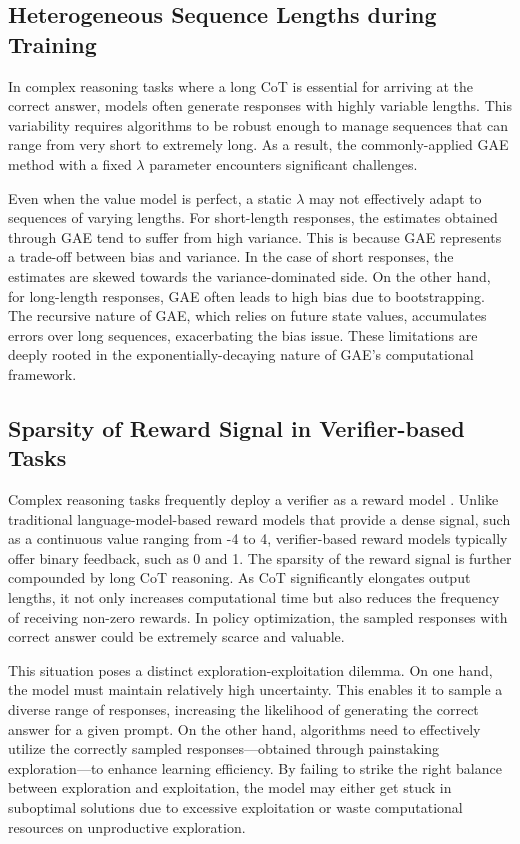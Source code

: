 \subsection{Heterogeneous Sequence Lengths during Training}

In complex reasoning tasks where a long CoT is essential for arriving at the correct answer, models often generate responses with highly variable lengths. This variability requires algorithms to be robust enough to manage sequences that can range from very short to extremely long. As a result, the commonly-applied GAE method with a fixed $\lambda$ parameter encounters significant challenges.

Even when the value model is perfect, a static $\lambda$ may not effectively adapt to sequences of varying lengths. For short-length responses, the estimates obtained through GAE tend to suffer from high variance. This is because GAE represents a trade-off between bias and variance. In the case of short responses, the estimates are skewed towards the variance-dominated side. On the other hand, for long-length responses, GAE often leads to high bias due to bootstrapping. The recursive nature of GAE, which relies on future state values, accumulates errors over long sequences, exacerbating the bias issue. These limitations are deeply rooted in the exponentially-decaying nature of GAE's computational framework.

\subsection{Sparsity of Reward Signal in Verifier-based Tasks}
\label{challenge3}

Complex reasoning tasks frequently deploy a verifier as a reward model \citep{o1, deepseekai2025deepseekr1incentivizingreasoningcapability}. Unlike traditional language-model-based reward models that provide a dense signal, such as a continuous value ranging from -4 to 4, verifier-based reward models typically offer binary feedback, such as 0 and 1. The sparsity of the reward signal is further compounded by long CoT reasoning. As CoT significantly elongates output lengths, it not only increases computational time but also reduces the frequency of receiving non-zero rewards. In policy optimization, the sampled responses with correct answer could be extremely scarce and valuable.

This situation poses a distinct exploration-exploitation dilemma. On one hand, the model must maintain relatively high uncertainty. This enables it to sample a diverse range of responses, increasing the likelihood of generating the correct answer for a given prompt. On the other hand, algorithms need to effectively utilize the correctly sampled responses—obtained through painstaking exploration—to enhance learning efficiency. By failing to strike the right balance between exploration and exploitation, the model may either get stuck in suboptimal solutions due to excessive exploitation or waste computational resources on unproductive exploration.